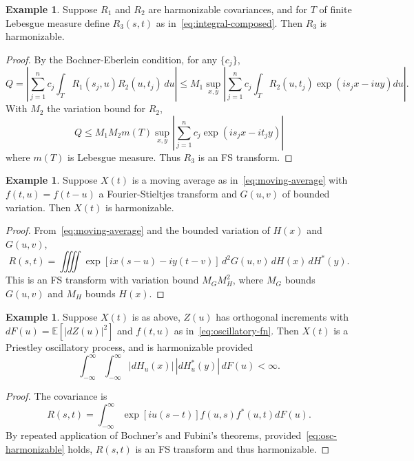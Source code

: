 \documentclass[11pt]{article}
\theoremstyle{plain}
\theoremstyle{definition}
\newtheorem{example}[theorem]{Example}
\theoremstyle{remark}
\begin{document}
\begin{example}
\label{ex:integral-composed}
Suppose $R_1$ and $R_2$ are harmonizable covariances, and for $T$ of finite Lebesgue measure define $R_3(s,t)$ as in~\eqref{eq:integral-composed}. Then $R_3$ is harmonizable.
\end{example}

\begin{proof}
By the Bochner-Eberlein condition, for any $\{c_j\}$,
\[
Q = \left|\sum_{j=1}^n c_j \int_T R_1(s_j, u) R_2(u, t_j)\, du \right| \leq M_1 \sup_{x, y} \left|\sum_{j=1}^n c_j \int_T R_2(u, t_j) \exp(is_j x - iuy) du \right|.
\]
With $M_2$ the variation bound for $R_2$,
\[
Q \leq M_1 M_2 m(T) \sup_{x, y} \left|\sum_{j=1}^n c_j \exp(is_j x - i t_j y)\right|
\]
where $m(T)$ is Lebesgue measure. Thus $R_3$ is an FS transform.
\end{proof}

\begin{example}
Suppose $X(t)$ is a moving average as in~\eqref{eq:moving-average} with $f(t,u) = f(t-u)$ a Fourier-Stieltjes transform and $G(u,v)$ of bounded variation. Then $X(t)$ is harmonizable.
\end{example}

\begin{proof}
From~\eqref{eq:moving-average} and the bounded variation of $H(x)$ and $G(u,v)$,
\[
R(s,t) = \iiiint \exp[ix(s-u) - iy(t-v)] \, d^2G(u,v) \, dH(x) \, dH^*(y).
\]
This is an FS transform with variation bound $M_G M_H^2$, where $M_G$ bounds $G(u,v)$ and $M_H$ bounds $H(x)$.
\end{proof}

\begin{example}
Suppose $X(t)$ is as above, $Z(u)$ has orthogonal increments with $dF(u) = \mathbb{E}[|dZ(u)|^2]$ and $f(t,u)$ as in~\eqref{eq:oscillatory-fn}. Then $X(t)$ is a Priestley oscillatory process, and is harmonizable provided
\begin{equation}
\int_{-\infty}^{\infty} \int_{-\infty}^{\infty} |dH_u(x)|\,|dH_u^*(y)|\, dF(u) < \infty.
\label{eq:osc-harmonizable}
\end{equation}
\end{example}

\begin{proof}
The covariance is
\[
R(s,t) = \int_{-\infty}^\infty \exp[iu(s-t)] f(u, s) f^*(u, t) dF(u).
\]
By repeated application of Bochner's and Fubini's theorems, provided~\eqref{eq:osc-harmonizable} holds, $R(s,t)$ is an FS transform and thus harmonizable.
\end{proof}
\end{document}
